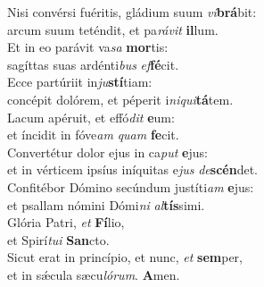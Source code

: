 \oddverse Nisi convérsi fuéritis, gládium suum \textit{vi}\textbf{brá}bit:~\*\\
\oddverse arcum suum teténdit, et pa\textit{rá}\textit{vit} \textbf{il}lum.\\
\evenverse Et in eo parávit va\textit{sa} \textbf{mor}tis:~\*\\
\evenverse sagíttas suas ardénti\textit{bus} \textit{ef}\textbf{fé}cit.\\
\oddverse Ecce partúriit in\textit{ju}\textbf{stí}tiam:~\*\\
\oddverse concépit dolórem, et péperit i\textit{ni}\textit{qui}\textbf{tá}tem.\\
\evenverse Lacum apéruit, et effó\textit{dit} \textbf{e}um:~\*\\
\evenverse et íncidit in fóve\textit{am} \textit{quam} \textbf{fe}cit.\\
\oddverse Convertétur dolor ejus in ca\textit{put} \textbf{e}jus:~\*\\
\oddverse et in vérticem ipsíus iníquitas e\textit{jus} \textit{de}\textbf{scén}det.\\
\evenverse Confitébor Dómino secúndum justíti\textit{am} \textbf{e}jus:~\*\\
\evenverse et psallam nómini Dómi\textit{ni} \textit{al}\textbf{tís}simi.\\
\oddverse Glória Patri, \textit{et} \textbf{Fí}lio,~\*\\
\oddverse et Spirí\textit{tu}\textit{i} \textbf{San}cto.\\
\evenverse Sicut erat in princípio, et nunc, \textit{et} \textbf{sem}per,~\*\\
\evenverse et in sǽcula sæcu\textit{ló}\textit{rum}. \textbf{A}men.\\

